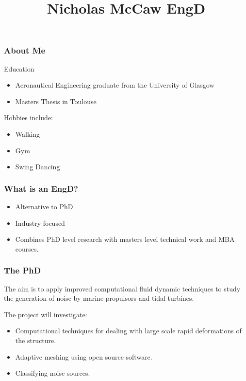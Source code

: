 \documentclass{beamer}
\begin{document}
	\title{Nicholas McCaw EngD}
	\frame{\titlepage}
	\begin{frame}
		\frametitle{About Me}
		Education
		\begin{itemize}	
		\item Aeronautical Engineering graduate from the University of Glasgow
		\item Masters Thesis in Toulouse
		\end{itemize}
		Hobbies include:
		\begin{itemize}
			\item Walking
			\item Gym
			\item Swing Dancing
		\end{itemize}
	\end{frame}
	\begin{frame}
		\frametitle{What is an EngD?}
		\begin{itemize}
			\item Alternative to PhD
			\item Industry focused 
			\item Combines PhD level research with masters level technical work and MBA courses.
		\end{itemize}
	\end{frame}

	\begin{frame}
		\frametitle{The PhD}
		The aim is to apply improved computational fluid dynamic techniques to study the generation of noise by marine propulsors and tidal turbines.
		
		The project will investigate:
		\begin{itemize}
			\item Computational techniques for dealing with large scale rapid deformations of the structure.
			\item Adaptive meshing using open source software.
			\item Classifying noise sources.
		\end{itemize}
	\end{frame}
\end{document}

